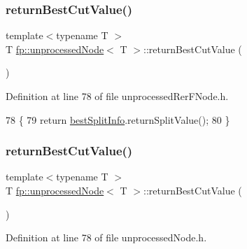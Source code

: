 \subsubsection{\texorpdfstring{return\+Best\+Cut\+Value()}{returnBestCutValue()}\hspace{0.1cm}{\footnotesize\ttfamily [1/2]}}
{\footnotesize\ttfamily template$<$typename T $>$ \\
T \hyperlink{classfp_1_1unprocessedNode}{fp\+::unprocessed\+Node}$<$ T $>$\+::return\+Best\+Cut\+Value (\begin{DoxyParamCaption}{ }\end{DoxyParamCaption})\hspace{0.3cm}{\ttfamily [inline]}}



Definition at line 78 of file unprocessed\+Rer\+F\+Node.\+h.


\begin{DoxyCode}
78                                              \{
79                     \textcolor{keywordflow}{return} \hyperlink{classfp_1_1unprocessedNode_ae60e5f84c9a80537cb84dfd17e70e893}{bestSplitInfo}.returnSplitValue();
80                 \}
\end{DoxyCode}
\mbox{\label{classfp_1_1unprocessedNode_ace7db1655a4f21d4d39c989ff1db806b}} 
\subsubsection{\texorpdfstring{return\+Best\+Cut\+Value()}{returnBestCutValue()}\hspace{0.1cm}{\footnotesize\ttfamily [2/2]}}
{\footnotesize\ttfamily template$<$typename T $>$ \\
T \hyperlink{classfp_1_1unprocessedNode}{fp\+::unprocessed\+Node}$<$ T $>$\+::return\+Best\+Cut\+Value (\begin{DoxyParamCaption}{ }\end{DoxyParamCaption})\hspace{0.3cm}{\ttfamily [inline]}}



Definition at line 78 of file unprocessed\+Node.\+h.


